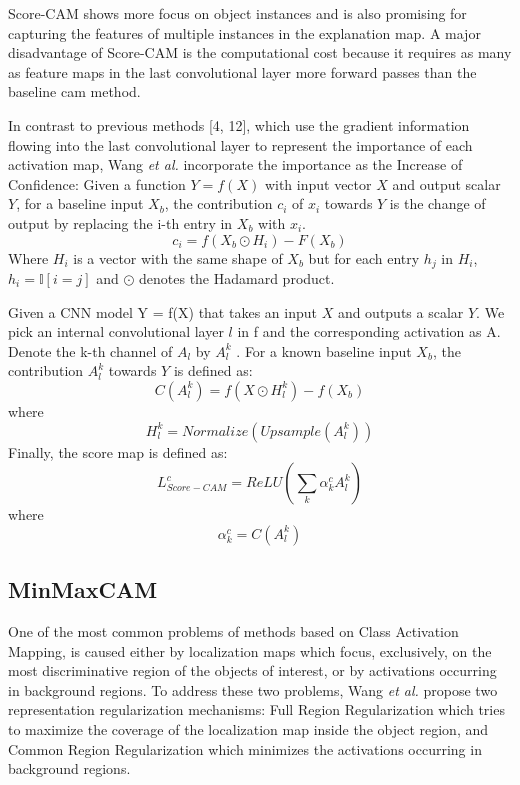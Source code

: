 Score-CAM shows more focus on object instances and is also promising for capturing the features of multiple instances in the explanation map. A major disadvantage of Score-CAM is the computational cost because it requires as many as feature maps in the last convolutional layer more forward passes than the baseline \acrshort{cam} method.

In contrast to previous methods [4, 12], which use the gradient information flowing into the last convolutional layer to represent the importance of each activation map, Wang \textit{et al.} incorporate the importance as the Increase of Confidence: Given a function $Y = f(X)$ with input vector $X$ and output scalar $Y$, for a baseline input $X_b$, the contribution $c_i$ of $x_i$ towards $Y$ is the change of output by replacing the i-th entry in $X_b$ with $x_i$.
\begin{equation}
    c_i = f(X_b \odot H_i) - F(X_b)
\end{equation}
Where $H_i$ is a vector with the same shape of $X_b$ but for each entry $h_j$ in $H_i$, $h_i = \mathbb{I}[i=j]$ and $\odot$ denotes the Hadamard product.

Given a CNN model Y = f(X) that takes an input $X$ and outputs a scalar $Y$. We pick an internal convolutional layer $l$ in f and the corresponding activation as A. Denote the
k-th channel of $A_l$ by $A^k_l$ . For a known baseline input $X_b$,
the contribution $A^k_l$ towards $Y$ is defined as:
\begin{equation}
    C(A^k_l) = f(X \odot H^k_l) - f(X_b)
\end{equation}
where
\begin{equation}
    H^k_l = Normalize(Upsample(A^k_l))
\end{equation}
Finally, the score map is defined as:
\begin{equation}
    L^{c}_{Score-CAM} = ReLU(\sum_{k} \alpha^{c}_{k} A^k_l)
\end{equation}
where
\begin{equation}
    \alpha^{c}_{k} = C(A^k_l)
\end{equation}

\subsection{MinMaxCAM}
One of the most common problems of methods based on Class Activation Mapping,
is caused either by localization maps which focus, exclusively, on the most discriminative region of the objects of interest, or by activations occurring
in background regions. To address these two problems, Wang \textit{et al.} \cite{wang2021minmaxcam} propose two representation regularization mechanisms: Full Region Regularization which tries to maximize the coverage of the localization map inside the object region, and Common Region Regularization which minimizes the activations occurring in background regions.


